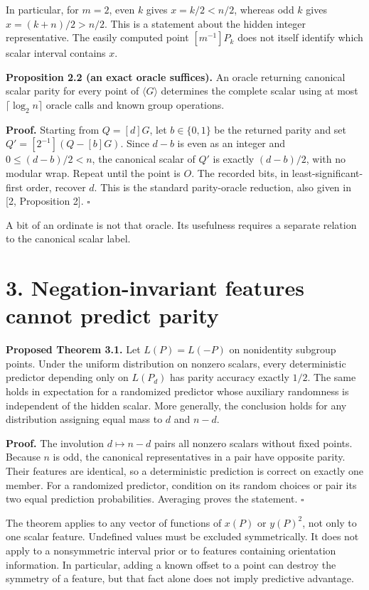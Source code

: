 \documentclass[
  11pt,
  a4paper,
]{article}
\begin{document}
In particular, for \(m=2\), even \(k\) gives \(x=k/2<n/2\), whereas odd
\(k\) gives \(x=(k+n)/2>n/2\). This is a statement about the hidden
integer representative. The easily computed point \([m^{-1}]P_k\) does
not itself identify which scalar interval contains \(x\).

\textbf{Proposition 2.2 (an exact oracle suffices).} An oracle returning
canonical scalar parity for every point of \(\langle G\rangle\)
determines the complete scalar using at most \(\lceil\log_2 n\rceil\)
oracle calls and known group operations.

\textbf{Proof.} Starting from \(Q=[d]G\), let \(b\in\{0,1\}\) be the
returned parity and set \(Q'=[2^{-1}](Q-[b]G)\). Since \(d-b\) is even
as an integer and \(0\leq(d-b)/2<n\), the canonical scalar of \(Q'\) is
exactly \((d-b)/2\), with no modular wrap. Repeat until the point is
\(O\). The recorded bits, in least-significant-first order, recover
\(d\). This is the standard parity-oracle reduction, also given in {[}2,
Proposition 2{]}. \(\square\)

A bit of an ordinate is not that oracle. Its usefulness requires a
separate relation to the canonical scalar label.

\section{3. Negation-invariant features cannot predict
parity}\label{negation-invariant-features-cannot-predict-parity}

\textbf{Proposed Theorem 3.1.} Let \(L(P)=L(-P)\) on nonidentity
subgroup points. Under the uniform distribution on nonzero scalars,
every deterministic predictor depending only on \(L(P_d)\) has parity
accuracy exactly \(1/2\). The same holds in expectation for a randomized
predictor whose auxiliary randomness is independent of the hidden
scalar. More generally, the conclusion holds for any distribution
assigning equal mass to \(d\) and \(n-d\).

\textbf{Proof.} The involution \(d\mapsto n-d\) pairs all nonzero
scalars without fixed points. Because \(n\) is odd, the canonical
representatives in a pair have opposite parity. Their features are
identical, so a deterministic prediction is correct on exactly one
member. For a randomized predictor, condition on its random choices or
pair its two equal prediction probabilities. Averaging proves the
statement. \(\square\)

The theorem applies to any vector of functions of \(x(P)\) or
\(y(P)^2\), not only to one scalar feature. Undefined values must be
excluded symmetrically. It does not apply to a nonsymmetric interval
prior or to features containing orientation information. In particular,
adding a known offset to a point can destroy the symmetry of a feature,
but that fact alone does not imply predictive advantage.
\end{document}
